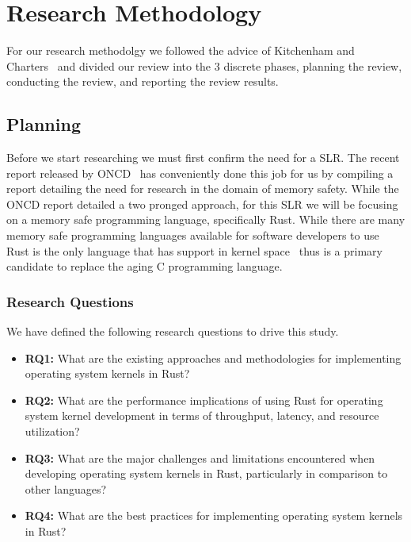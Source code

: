 \documentclass[sigconf]{acmart}
\begin{document}
\section{Research Methodology}

For our research methodolgy we followed the advice of Kitchenham and Charters~\cite{Stuart2007-cc}
and divided our review into the 3 discrete phases, planning the review, conducting the review, and
reporting the review results.

\subsection{Planning}

Before we start researching we must first confirm the need for a SLR. The recent report released by
ONCD~\cite{United_States_Gov2024-pp} has conveniently done this job for us by compiling a report
detailing the need for research in the domain of memory safety. While the ONCD report detailed a two
pronged approach, for this SLR we will be focusing on a memory safe programming language,
specifically Rust. While there are many memory safe programming languages available for software
developers to use Rust is the only language that has support in kernel
space~\cite{The_kernel_development_community_undated-iw} thus is a primary candidate to replace the
aging C programming language.

\subsubsection{Research Questions}
\label{sec:researchQuestions}

We have defined the following research questions to drive this study.

\begin{itemize}
    \item \textbf{RQ1:} What are the existing approaches and methodologies for implementing
      operating system kernels in Rust?
    \item \textbf{RQ2:} What are the performance implications of using Rust for operating system
      kernel development in terms of throughput, latency, and resource utilization?
    \item \textbf{RQ3:} What are the major challenges and limitations encountered when developing
      operating system kernels in Rust, particularly in comparison to other languages?
    \item \textbf{RQ4:} What are the best practices for implementing operating system kernels in Rust?
\end{itemize}
\end{document}
